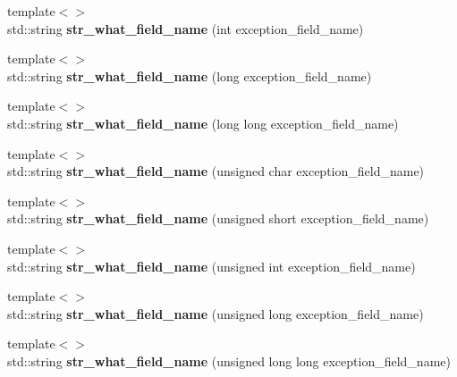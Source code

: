 \begin{DoxyCompactItemize}
{\footnotesize template$<$$>$ }\\std\+::string {\bfseries str\+\_\+what\+\_\+field\+\_\+name} (int exception\+\_\+field\+\_\+name)
\item 
\mbox{\label{struct_s_p_u_1_1_did_not_found_data_by_name_a628b73d6943beabb40b673ce6330adcf}} 
{\footnotesize template$<$$>$ }\\std\+::string {\bfseries str\+\_\+what\+\_\+field\+\_\+name} (long exception\+\_\+field\+\_\+name)
\item 
\mbox{\label{struct_s_p_u_1_1_did_not_found_data_by_name_a002db0e9a1d51d97e364d9fa65761a6b}} 
{\footnotesize template$<$$>$ }\\std\+::string {\bfseries str\+\_\+what\+\_\+field\+\_\+name} (long long exception\+\_\+field\+\_\+name)
\item 
\mbox{\label{struct_s_p_u_1_1_did_not_found_data_by_name_ab59e8e166000ff1e78b2513a581af83a}} 
{\footnotesize template$<$$>$ }\\std\+::string {\bfseries str\+\_\+what\+\_\+field\+\_\+name} (unsigned char exception\+\_\+field\+\_\+name)
\item 
\mbox{\label{struct_s_p_u_1_1_did_not_found_data_by_name_a6a7a4efc625655a52f51556e7b43e34d}} 
{\footnotesize template$<$$>$ }\\std\+::string {\bfseries str\+\_\+what\+\_\+field\+\_\+name} (unsigned short exception\+\_\+field\+\_\+name)
\item 
\mbox{\label{struct_s_p_u_1_1_did_not_found_data_by_name_a280963185fa98104389ac5c251ed1042}} 
{\footnotesize template$<$$>$ }\\std\+::string {\bfseries str\+\_\+what\+\_\+field\+\_\+name} (unsigned int exception\+\_\+field\+\_\+name)
\item 
\mbox{\label{struct_s_p_u_1_1_did_not_found_data_by_name_abc7807ef28df635a8cb81ac9c5ce14d9}} 
{\footnotesize template$<$$>$ }\\std\+::string {\bfseries str\+\_\+what\+\_\+field\+\_\+name} (unsigned long exception\+\_\+field\+\_\+name)
\item 
\mbox{\label{struct_s_p_u_1_1_did_not_found_data_by_name_a5d563db79ddbb7c67ee24a3d0a2367f7}} 
{\footnotesize template$<$$>$ }\\std\+::string {\bfseries str\+\_\+what\+\_\+field\+\_\+name} (unsigned long long exception\+\_\+field\+\_\+name)
\end{DoxyCompactItemize}
